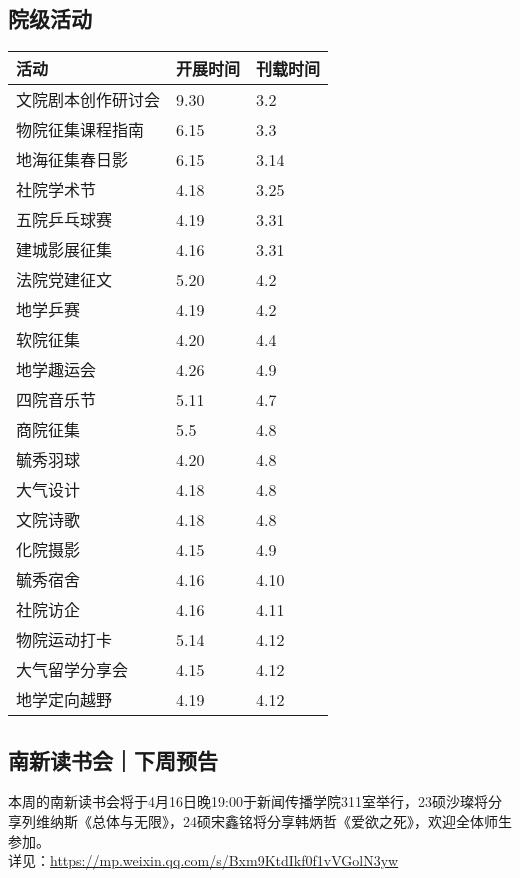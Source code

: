 \documentclass[letterpaper, 12pt]{article}
\begin{document}
\begin{multicols}{2}
\section{院级活动}
\begin{tabular}{|>{\centering\arraybackslash}m{}|m{}|m{}|}
\hline
    活动 & 开展时间 & 刊载时间\\
    \hline\hline
    文院剧本创作研讨会 & 9.30 & 3.2\\
    物院征集课程指南 & 6.15 & 3.3\\
    地海征集春日影 & 6.15 & 3.14\\
    社院学术节 & 4.18 & 3.25\\
    五院乒乓球赛 & 4.19 & 3.31\\
    建城影展征集 & 4.16 & 3.31\\
    法院党建征文 & 5.20 & 4.2\\
    地学乒赛 & 4.19 & 4.2\\
    软院征集 & 4.20 & 4.4\\
    地学趣运会 & 4.26 & 4.9\\
    四院音乐节 & 5.11 & 4.7\\
    商院征集 & 5.5 & 4.8\\
    毓秀羽球 & 4.20 & 4.8\\
    大气设计 & 4.18 & 4.8\\
    文院诗歌 & 4.18 & 4.8\\
    化院摄影 & 4.15 & 4.9\\
    毓秀宿舍 & 4.16 & 4.10\\
    社院访企 & 4.16 & 4.11\\
    物院运动打卡 & 5.14 & 4.12\\
    大气留学分享会 & 4.15 & 4.12\\
    地学定向越野 & 4.19 & 4.12\\
    \hline
\end{tabular}

\subsection{南新读书会｜下周预告}
本周的南新读书会将于4月16日晚19:00于新闻传播学院311室举行，23硕沙璨将分享列维纳斯《总体与无限》，24硕宋鑫铭将分享韩炳哲《爱欲之死》，欢迎全体师生参加。
\\详见：\url{https://mp.weixin.qq.com/s/Bxm9KtdIkf0f1vVGolN3yw}



\end{multicols}
\end{document}
